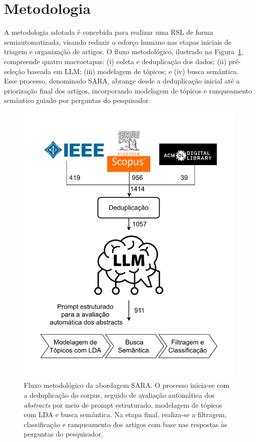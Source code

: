 \documentclass{siintec}
\begin{document}
\section{Metodologia}
\label{sec:metodologia}
A metodologia adotada é concebida para realizar uma RSL de forma semiautomatizada, visando reduzir o esforço humano nas etapas iniciais de triagem e organização de artigos. O fluxo metodológico, ilustrado na Figura~\ref{fig:fluxo_sara}, compreende quatro macroetapas: (i) coleta e deduplicação dos dados; (ii) pré-seleção baseada em LLM; (iii) modelagem de tópicos; e (iv) busca semântica. Esse processo, denominado SARA, abrange desde a deduplicação inicial até a priorização final dos artigos, incorporando modelagem de tópicos e ranqueamento semântico guiado por perguntas do pesquisador.

\begin{figure}[ht]
    \centering

    \includegraphics[width=0.95\linewidth]{img/fluxo_sara.pdf}

        \caption{Fluxo metodológico da abordagem SARA. O processo inicia-se com a deduplicação do corpus, seguido de avaliação automática dos \textit{abstracts} por meio de prompt estruturado, modelagem de tópicos com LDA e busca semântica. Na etapa final, realiza-se a filtragem, classificação e ranqueamento dos artigos com base nas respostas às perguntas do pesquisador.}

    \label{fig:fluxo_sara}
\end{figure}
\end{document}
